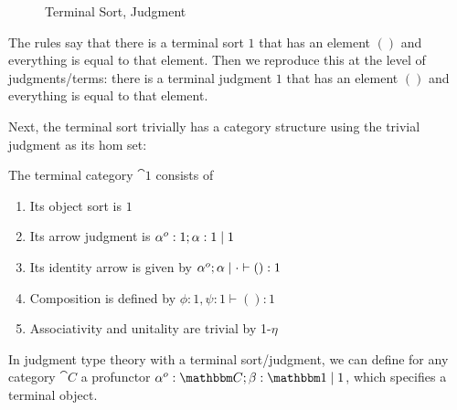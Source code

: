 \documentclass{article}
\begin{document}
\begin{figure}
  \caption{Terminal Sort, Judgment}
\end{figure}

The rules say that there is a terminal sort $1$ that has an element
$()$ and everything is equal to that element.
Then we reproduce this at the level of judgments/terms: there is a
terminal judgment $1$ that has an element $()$ and everything is equal
to that element.

Next, the terminal sort trivially has a category structure using the
trivial judgment as its hom set:

\begin{definition}
  The terminal category $\cat 1$ consists of
  \begin{enumerate}
  \item Its object sort is $1$
  \item Its arrow judgment is $\alpha^o:1;\alpha:1 \mathrel{|} 1$
  \item Its identity arrow is given by $\alpha^o;\alpha \mathrel{|} \cdot \vdash () : 1$
  \item Composition is defined by $\phi : 1, \psi : 1 \vdash () : 1$
  \item Associativity and unitality are trivial by \textsc{1-$\eta$}
  \end{enumerate}
\end{definition}

\begin{definition}
  In judgment type theory with a terminal sort/judgment, we can define
  for any category $\cat C$ a profunctor $\alpha^o:\cat C;\beta : \cat
  1 \pipe 1$, which specifies a terminal object.
\end{definition}
\end{document}
